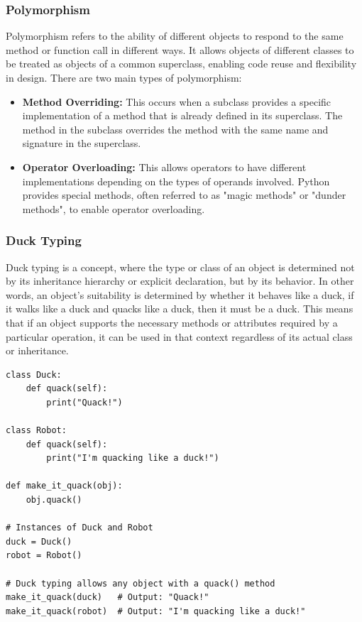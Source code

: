 \newpage
\subsubsection{Polymorphism}
Polymorphism refers to the ability of different objects to respond to the same method or function call in different ways. It allows objects of different classes to be treated as objects of a common superclass, enabling code reuse and flexibility in design. There are two main types of polymorphism:

\begin{itemize}
    \item \textbf{Method Overriding:} This occurs when a subclass provides a specific implementation of a method that is already defined in its superclass. The method in the subclass overrides the method with the same name and signature in the superclass.
    
    \item \textbf{Operator Overloading:} This allows operators to have different implementations depending on the types of operands involved. Python provides special methods, often referred to as "magic methods" or "dunder methods", to enable operator overloading.
\end{itemize}

\subsubsection{Duck Typing}
Duck typing is a concept, where the type or class of an object is determined not by its inheritance hierarchy or explicit declaration, but by its behavior. In other words, an object's suitability is determined by whether it behaves like a duck, if it walks like a duck and quacks like a duck, then it must be a duck.
This means that if an object supports the necessary methods or attributes required by a particular operation, it can be used in that context regardless of its actual class or inheritance.

\begin{codebox}
\begin{verbatim}
class Duck:
    def quack(self):
        print("Quack!")

class Robot:
    def quack(self):
        print("I'm quacking like a duck!")

def make_it_quack(obj):
    obj.quack()

# Instances of Duck and Robot
duck = Duck()
robot = Robot()

# Duck typing allows any object with a quack() method
make_it_quack(duck)   # Output: "Quack!"
make_it_quack(robot)  # Output: "I'm quacking like a duck!"
\end{verbatim}
\end{codebox}

